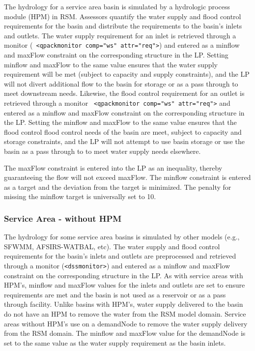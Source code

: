 The hydrology for a service area basin is simulated by a hydrologic
process module (HPM) in RSM.  Assessors quantify the water supply and
flood control requirements for the basin and distribute the
requirements to the basin's inlets and outlets.  The water supply
requirement for an inlet is retrieved through a monitor ({\tt
  <qpackmonitor comp="ws" attr="req">}) and entered as a minflow and
maxFlow constraint on the corresponding structure in the LP.  Setting
minflow and maxFlow to the same value ensures that the water supply
requirement will be met (subject to capacity and supply constraints),
and the LP will not divert additional flow to the basin for storage or
as a pass through to meet downstream needs.  Likewise, the flood
control requirement for an outlet is retrieved through a monitor {\tt
  <qpackmonitor comp="ws" attr="req">} and entered as a minflow and
maxFlow constraint on the corresponding structure in the LP.  Setting
the minflow and maxFlow to the same value ensures that the flood
control flood control needs of the basin are meet, subject to capacity
and storage constraints, and the LP will not attempt to use basin
storage or use the basin as a pass through to to meet water supply
needs elsewhere.

The maxFlow constraint is entered into the LP as an inequality,
thereby guaranteeing the flow will not exceed maxFlow.  The minflow
constraint is entered as a target and the deviation from the target is
minimized.  The penalty for missing the minflow target is universally
set to 10.

\subsubsection {Service Area \-- without HPM}

The hydrology for some service area basins is simulated by other
models (e.g., SFWMM, AFSIRS\--WATBAL, etc).  The water supply and
flood control requirements for the basin's inlets and outlets are
preprocessed and retrieved through a monitor ({\tt <dssmonitor>}) and
entered as a minflow and maxFlow constraint on the corresponding
structure in the LP.  As with service areas with HPM's, minflow and
maxFlow values for the inlets and outlets are set to ensure
requirements are met and the basin is not used as a reservoir or as a
pass through facility.  Unlike basins with HPM's, water supply
delivered to the basin do not have an HPM to remove the water from
the RSM model domain.  Service areas without HPM's use on a demandNode
to remove the water supply delivery from the RSM domain.  The minflow
and maxFlow value for the demandNode is set to the same value as the
water supply requirement as the basin inlets.

